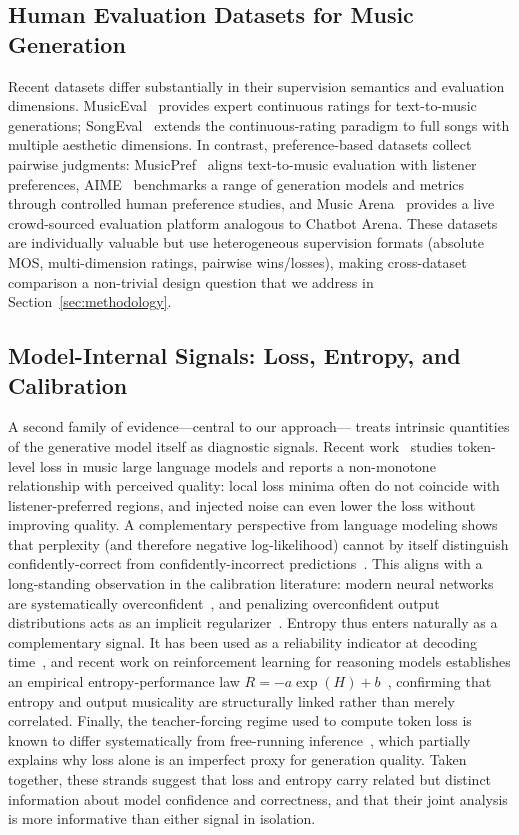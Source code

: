 \documentclass{article}
\begin{document}
\subsection{Human Evaluation Datasets for Music Generation}

Recent datasets differ substantially
in their supervision semantics and evaluation dimensions.
MusicEval~\cite{liu2025musiceval}
provides expert continuous ratings for text-to-music generations;
SongEval~\cite{yao2025songeval}
extends the continuous-rating paradigm to full songs
with multiple aesthetic dimensions.
In contrast, preference-based datasets collect pairwise judgments:
MusicPref~\cite{huang2025musicpref}
aligns text-to-music evaluation with listener preferences,
AIME~\cite{grotschla2025aime}
benchmarks a range of generation models and metrics
through controlled human preference studies,
and Music Arena~\cite{kim2025musicarena}
provides a live crowd-sourced evaluation platform analogous to Chatbot Arena.
These datasets are individually valuable
but use heterogeneous supervision formats
(absolute MOS, multi-dimension ratings, pairwise wins/losses),
making cross-dataset comparison a non-trivial design question
that we address in Section~\ref{sec:methodology}.

\subsection{Model-Internal Signals: Loss, Entropy, and Calibration}

A second family of evidence---central to our approach---%
treats intrinsic quantities of the generative model itself
as diagnostic signals.
Recent work~\cite{li2026noiseloss} studies token-level loss
in music large language models
and reports a non-monotone relationship with perceived quality:
local loss minima often do not coincide with listener-preferred regions,
and injected noise can even lower the loss without improving quality.
A complementary perspective from language modeling shows
that perplexity (and therefore negative log-likelihood)
cannot by itself distinguish confidently-correct
from confidently-incorrect predictions~\cite{velickovic2026perplexity}.
This aligns with a long-standing observation in the calibration literature:
modern neural networks are systematically
overconfident~\cite{guo2017calibration},
and penalizing overconfident output distributions
acts as an implicit regularizer~\cite{pereyra2017confidence}.
Entropy thus enters naturally as a complementary signal.
It has been used as a reliability indicator at decoding
time~\cite{qiu2024entropy}, and recent work on reinforcement learning
for reasoning models establishes
an empirical entropy-performance law
$R=-a\exp(H)+b$~\cite{cui2025entropy},
confirming that entropy and output musicality are structurally linked
rather than merely correlated.
Finally, the teacher-forcing regime used to compute token loss
is known to differ systematically from free-running
inference~\cite{wiseman2016sequence},
which partially explains why loss alone is an imperfect
proxy for generation quality.
Taken together, these strands suggest that
loss and entropy carry related but distinct information
about model confidence and correctness,
and that their joint analysis
is more informative than either signal in isolation.
\end{document}
